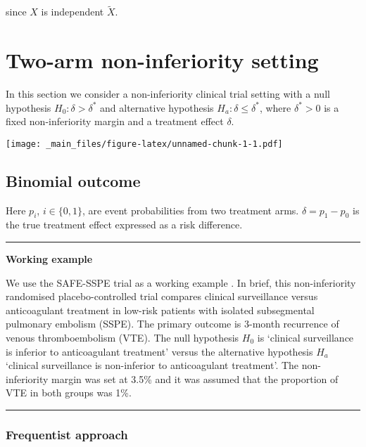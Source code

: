 \documentclass[
]{book}
\begin{document}
since \(X\) is independent \(\tilde X\).

\hypertarget{two-arm-non-inferiority-setting}{%
\chapter{Two-arm non-inferiority setting}\label{two-arm-non-inferiority-setting}}

In this section we consider a non-inferiority clinical trial setting with a null hypothesis \(H_0: \delta > \delta^*\) and alternative hypothesis \(H_a: \delta \leq \delta^*\), where \(\delta^*>0\) is a fixed non-inferiority margin and a treatment effect \(\delta\).

\texttt{[image: \_main\_files/figure-latex/unnamed-chunk-1-1.pdf]}

\hypertarget{binomial-outcome}{%
\section{Binomial outcome}\label{binomial-outcome}}

Here \(p_i\), \(i\in \{0,1\}\), are event probabilities from two treatment arms. \(\delta=p_1-p_0\) is the true treatment effect expressed as a risk difference.

\begin{center}\rule{0.5\linewidth}{0.5pt}\end{center}

\textbf{Working example}

We use the SAFE-SSPE trial as a working example \citet{Baumgartner2020}. In brief, this non-inferiority randomised placebo-controlled trial compares clinical surveillance versus anticoagulant treatment in low-risk patients with isolated subsegmental pulmonary embolism (SSPE). The primary outcome is 3-month recurrence of venous thromboembolism (VTE). The null hypothesis \(H_0\) is `clinical surveillance is inferior to anticoagulant treatment' versus the alternative hypothesis \(H_a\) `clinical surveillance is non-inferior to anticoagulant treatment'. The non-inferiority margin was set at 3.5\% and it was assumed that the proportion of VTE in both groups was 1\%.

\begin{center}\rule{0.5\linewidth}{0.5pt}\end{center}

\hypertarget{frequentist-approach}{%
\subsection{Frequentist approach}\label{frequentist-approach}}
\end{document}

